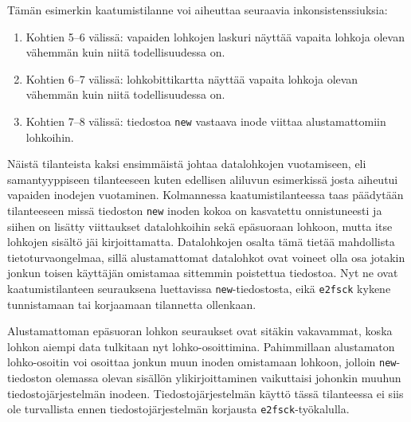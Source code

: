 Tämän esimerkin kaatumistilanne voi aiheuttaa seuraavia inkonsistenssiuksia:
\begin{enumerate}
    \item{Kohtien 5--6 välissä: vapaiden lohkojen laskuri näyttää vapaita lohkoja olevan vähemmän kuin niitä todellisuudessa on.}
    \item{Kohtien 6--7 välissä: lohkobittikartta näyttää vapaita lohkoja olevan vähemmän kuin niitä todellisuudessa on.}
    \item{Kohtien 7--8 välissä: tiedostoa \texttt{new} vastaava inode viittaa alustamattomiin lohkoihin.}
\end{enumerate}
%
Näistä tilanteista kaksi ensimmäistä johtaa datalohkojen vuotamiseen,
eli samantyyppiseen tilanteeseen kuten edellisen aliluvun esimerkissä josta aiheutui vapaiden inodejen vuotaminen.
Kolmannessa kaatumistilanteessa taas päädytään tilanteeseen missä tiedoston \texttt{new} inoden kokoa on kasvatettu onnistuneesti ja siihen on lisätty viittaukset datalohkoihin sekä epäsuoraan lohkoon,
mutta itse lohkojen sisältö jäi kirjoittamatta.
Datalohkojen osalta tämä tietää mahdollista tietoturvaongelmaa,
sillä alustamattomat datalohkot ovat voineet olla osa jotakin jonkun toisen käyttäjän omistamaa sittemmin poistettua tiedostoa.
Nyt ne ovat kaatumistilanteen seurauksena luettavissa \texttt{new}-tiedostosta,
eikä \texttt{e2fsck} kykene tunnistamaan tai korjaamaan tilannetta ollenkaan.

Alustamattoman epäsuoran lohkon seuraukset ovat sitäkin vakavammat,
koska lohkon aiempi data tulkitaan nyt lohko-osoittimina.
Pahimmillaan alustamaton lohko-osoitin voi osoittaa jonkun muun inoden omistamaan lohkoon,
jolloin \texttt{new}-tiedoston olemassa olevan sisällön ylikirjoittaminen vaikuttaisi johonkin muuhun tiedostojärjestelmän inodeen.
Tiedostojärjestelmän käyttö tässä tilanteessa ei siis ole turvallista ennen tiedostojärjestelmän korjausta \texttt{e2fsck}-työkalulla.


